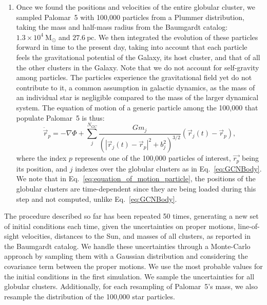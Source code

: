 \documentclass{aa}
\begin{document}
\begin{enumerate}
        \item Once we found the positions and velocities of the entire globular cluster, we sampled Palomar~5 with 100,000 particles from a Plummer distribution, taking the mass and half-mass radius from the Baumgardt catalog: $1.3\times10^{4}~\textrm{M}_\odot$ and $27.6~\textrm{pc}$. We then integrated the evolution of these particles forward in time to the present day, taking into account that each particle feels the gravitational potential of the Galaxy, its host cluster, and that of all the other clusters in the Galaxy. Note that we do not account for self-gravity among particles. The particles experience the gravitational field yet do not contribute to it, a common assumption in galactic dynamics, as the mass of an individual star is negligible compared to the mass of the larger dynamical system. The equation of motion of a generic particle among the 100,000 that populate Palomar~5 is thus: 
        \begin{equation}
          \ddot{\vec{r}}_p = -\nabla \Phi + \left.\sum_{j}^{N_{GC}} \frac{Gm_j}{\left(|\vec{r}_j(t) - \vec{r}_p|^2 + b_j^2\right)^{3/2}}\right. \left(\vec{r}_j(t)- \vec{r}_p\right),
          \end{equation} \label{eq:equation_of_motion_particle} where the index $p$ represents one of the 100,000 particles of interest, $\vec{r_p}$ being its position, and $j$ indexes over the globular clusters as in Eq.~\ref{eq:GCNBody}. We note that in Eq.~\ref{eq:equation_of_motion_particle}, the positions of the globular clusters are time-dependent since they are being loaded during this step and not computed, unlike Eq.~\ref{eq:GCNBody}. 

      \end{enumerate}




        The procedure described so far has been repeated 50 times, generating a new set of initial conditions each time, given the uncertainties on proper motions, line-of-sight velocities, distances to the Sun, and masses of all clusters, as reported in the Baumgardt catalog. We handle these uncertainties through a Monte-Carlo approach by sampling them with a Gaussian distribution and considering the covariance term between the proper motions. We use the most probable values for the initial conditions in the first simulation. We sample the uncertainties for all globular clusters. Additionally, for each resampling of Palomar~5's mass, we also resample the distribution of the 100,000 star particles. 
\end{document}

